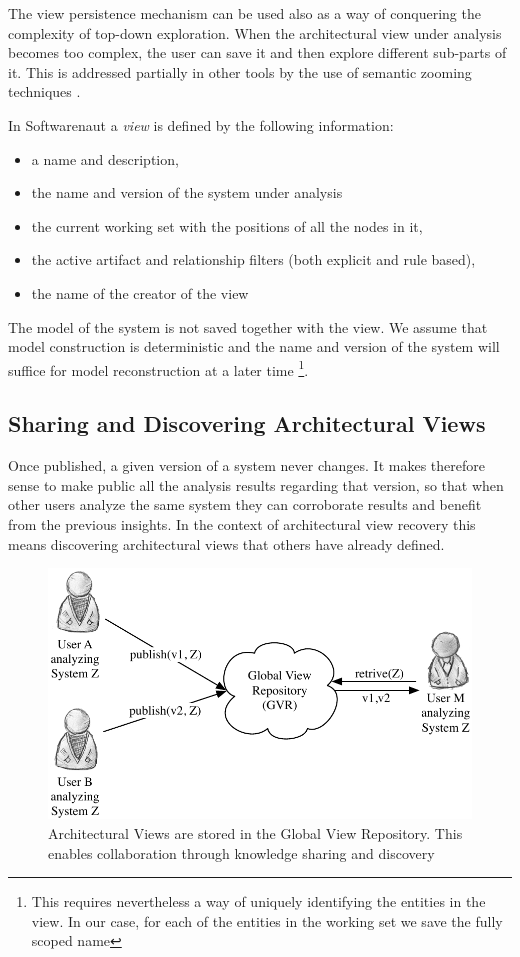 \documentclass[preprint,12pt]{elsarticle}
\begin{document}
The view persistence mechanism can be used also as a way of conquering the complexity of top-down exploration. When the architectural view under analysis becomes too complex, the user can save it and then explore different sub-parts of it. This is addressed partially in other tools by the use of semantic zooming techniques \cite{storey-shrimp}. 

In Softwarenaut a {\em view} is defined by the following information: 

\begin{itemize}
\item a name and description,
\item the name and version of the system under analysis
\item the current working set with the positions of all the nodes in it,
\item the active artifact and relationship filters (both explicit and rule based), 
\item the name of the creator of the view
\end{itemize}

The model of the system is not saved together with the view. We assume that model construction is deterministic and the name and version of the system will suffice for model reconstruction at a later time \footnote{This requires nevertheless a way of uniquely identifying the entities in the view. In our case, for each of the entities in the working set we save the fully scoped name}.

\subsection {Sharing and Discovering Architectural Views}

Once published, a given version of a system never changes. It makes therefore sense to make public all the analysis results regarding that version, so that when other users analyze the same system they can corroborate results and benefit from the previous insights. In the context of architectural view recovery this means discovering architectural views that others have already defined. 

\begin{figure}[ht]
\begin{center}
\includegraphics[width=0.7\linewidth]{CollaborationConcept}
\caption{Architectural Views are stored in the Global View Repository. This enables collaboration through knowledge sharing and discovery}
\end{center}
\end{figure}
\end{document}

